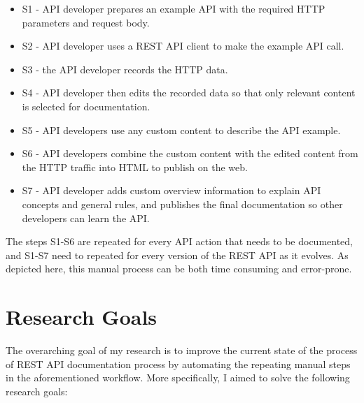 \begin{itemize}
  \item S1 - API developer prepares an example API with the required HTTP parameters and request body.
  \item S2 - API developer uses a REST API client to make the example API call.
  \item S3 - the API developer records the HTTP data.
  \item S4 - API developer then edits the recorded data so that only relevant content is selected for documentation.
  \item S5 - API developers use any custom content to describe the API example.
  \item S6 - API developers combine the custom content with the edited content from the HTTP traffic into HTML to publish on the web.
  \item S7 - API developer adds custom overview information to explain API concepts and general rules, and publishes the final documentation so other developers can learn the API.
\end{itemize}

The steps S1-S6 are repeated for every API action that needs to be documented, and S1-S7 need to repeated for every version of the REST API as it evolves. As depicted here, this manual process can be both time consuming and error-prone.

\section{Research Goals}
The overarching goal of my research is to improve the current state of the process of REST API documentation process by automating the repeating manual steps in the aforementioned workflow. More specifically, I aimed to solve the following research goals:

